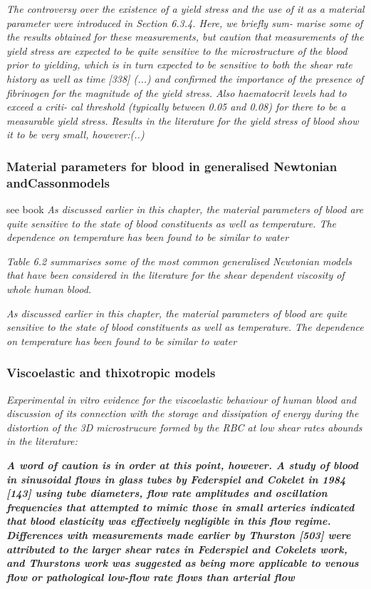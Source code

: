 \documentclass[11pt,letterpaper]{article}
\begin{document}
\textit{The controversy over the existence of a yield stress and the use of it as
a material parameter were introduced in Section 6.3.4. Here, we briefly sum- marise some of the results obtained for these measurements, but caution that measurements of the yield stress are expected to be quite sensitive to the microstructure of the blood prior to yielding, which is in turn expected to be sensitive to both the shear rate history as well as time [338] (...) and confirmed the importance of the presence of fibrinogen for the magnitude of the yield stress. Also haematocrit levels had to exceed a criti- cal threshold (typically between 0.05 and 0.08) for there to be a measurable yield stress. Results in the literature for the yield stress of blood show it to be very small, however:(..)}

\subsubsection*{Material parameters for blood in generalised Newtonian andCassonmodels}
see book
\textit{As discussed earlier in this chapter, the material parameters of blood are
quite sensitive to the state of blood constituents as well as temperature. The dependence on temperature has been found to be similar to water}

\textit{Table 6.2 summarises some of the most common generalised Newtonian
models that have been considered in the literature for the shear dependent viscosity of whole human blood.}

\textit{As discussed earlier in this chapter, the material parameters of blood are
quite sensitive to the state of blood constituents as well as temperature. The dependence on temperature has been found to be similar to water}

\subsubsection*{Viscoelastic and thixotropic models}
 \textit{Experimental in vitro evidence for the viscoelastic behaviour of human blood and discussion of its connection with the storage and dissipation of energy during the distortion of the 3D microstrucure formed by the RBC at low shear rates abounds in the literature:}

\textit{\textbf{A word of caution is in order at this point, however. A study of blood in sinusoidal flows in glass tubes by Federspiel and Cokelet in 1984 [143] using tube diameters, flow rate amplitudes and oscillation frequencies that attempted to mimic those in small arteries indicated that blood elasticity was effectively negligible in this flow regime. Differences with measurements made earlier by Thurston [503] were attributed to the larger shear rates in Federspiel and Cokelets work, and Thurstons work was suggested as being more applicable to venous flow or pathological low-flow rate flows than arterial flow}}
\end{document}
